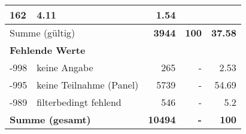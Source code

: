\begin{longtable}{lXrrr}
       \num{162} &
       \num[round-mode=places,round-precision=2]{4.11} &
         \num[round-mode=places,round-precision=2]{1.54} \\
     \midrule
     \multicolumn{2}{l}{Summe (gültig)} &
       \textbf{\num{3944}} &
     \textbf{\num{100}} &
       \textbf{\num[round-mode=places,round-precision=2]{37.58}} \\
     \multicolumn{5}{l}{\textbf{Fehlende Werte}}\\
       -998 &
       keine Angabe &
         \num{265} &
        - &
         \num[round-mode=places,round-precision=2]{2.53} \\
       -995 &
       keine Teilnahme (Panel) &
         \num{5739} &
        - &
         \num[round-mode=places,round-precision=2]{54.69} \\
       -989 &
       filterbedingt fehlend &
         \num{546} &
        - &
         \num[round-mode=places,round-precision=2]{5.2} \\
     \midrule
     \multicolumn{2}{l}{\textbf{Summe (gesamt)}} &
          \textbf{\num{10494}} &
        \textbf{-} &
        \textbf{\num{100}} \\
     \bottomrule
     \end{longtable}
     
